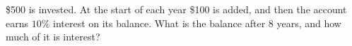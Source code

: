 \$500 is invested. At the start of each year \$100 is added, and then the account earns $10\%$ interest on its balance. What is the balance after $8$ years, and how much of it is interest?
